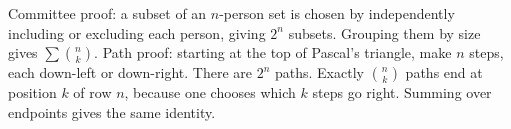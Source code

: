 Committee proof: a subset of an $n$-person set is chosen by independently including or excluding each person, giving $2^n$ subsets. Grouping them by size gives $\sum\binom nk$. Path proof: starting at the top of Pascal's triangle, make $n$ steps, each down-left or down-right. There are $2^n$ paths. Exactly $\binom nk$ paths end at position $k$ of row $n$, because one chooses which $k$ steps go right. Summing over endpoints gives the same identity.
